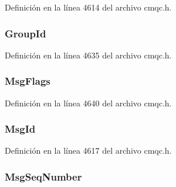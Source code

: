 Definición en la línea 4614 del archivo cmqc.\+h.

\hypertarget{structtag_m_q_m_d2_abcf7ab1abd1c768c0adb9acb3d09c6f1}{}
\subsubsection[{Group\+Id}]{ Group\+Id}\label{structtag_m_q_m_d2_abcf7ab1abd1c768c0adb9acb3d09c6f1}


Definición en la línea 4635 del archivo cmqc.\+h.

\hypertarget{structtag_m_q_m_d2_a10cb94bb1b2528f6ad936454455bb40a}{}
\subsubsection[{Msg\+Flags}]{ Msg\+Flags}\label{structtag_m_q_m_d2_a10cb94bb1b2528f6ad936454455bb40a}


Definición en la línea 4640 del archivo cmqc.\+h.

\hypertarget{structtag_m_q_m_d2_a075d401c83d67ca688e6165dda74a44c}{}
\subsubsection[{Msg\+Id}]{ Msg\+Id}\label{structtag_m_q_m_d2_a075d401c83d67ca688e6165dda74a44c}


Definición en la línea 4617 del archivo cmqc.\+h.

\hypertarget{structtag_m_q_m_d2_a7c78a4f7c1bbda9f124f904e0d02a7a2}{}
\subsubsection[{Msg\+Seq\+Number}]{ Msg\+Seq\+Number}\label{structtag_m_q_m_d2_a7c78a4f7c1bbda9f124f904e0d02a7a2}


